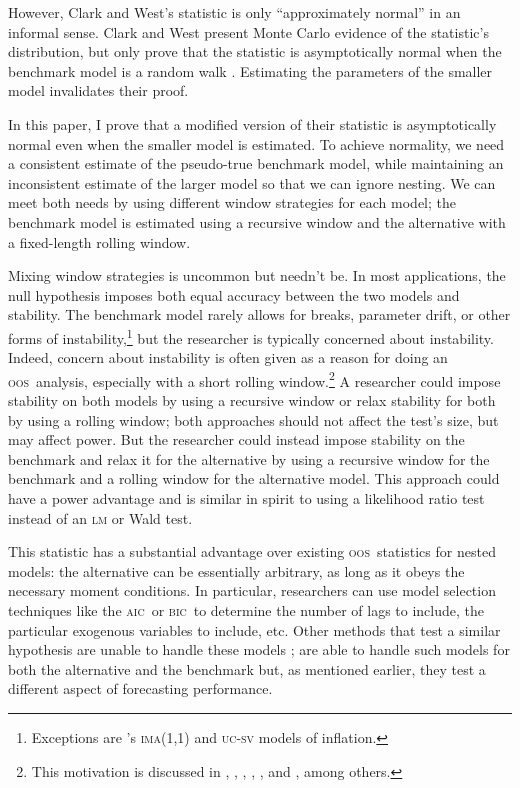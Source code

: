\documentclass[12pt]{article}
\newcommand\citepos[2][]{\citeauthor{#2}'s \citeyearpar[#1]{#2}}
\theoremstyle{definition}
\newcommand{\aic}{\textsc{aic}}
\newcommand{\bic}{\textsc{bic}}
\newcommand{\oos}{\textsc{oos}}
\begin{document}
However, Clark and West's statistic is only ``approximately normal''
in an informal sense.  Clark and West present Monte Carlo evidence of
the statistic's distribution, but only prove that the statistic is
asymptotically normal when the benchmark model is a random walk
\citep{ClW:06}. Estimating the parameters of the smaller model
invalidates their proof.

In this paper, I prove that a modified version of their statistic is
asymptotically normal even when the smaller model is estimated.  To
achieve normality, we need a consistent estimate of the pseudo-true
benchmark model, while maintaining an inconsistent estimate of the
larger model so that we can ignore nesting.  We can meet both needs by
using different window strategies for each model; the benchmark model
is estimated using a recursive window and the alternative with a
fixed-length rolling window.

Mixing window strategies is uncommon but needn't be. In most
applications, the null hypothesis imposes both equal accuracy between
the two models and stability.  The benchmark model rarely allows for
breaks, parameter drift, or other forms of
instability,\footnote{Exceptions are \citepos{StW:07}
  \textsc{ima}(1,1) and \textsc{uc-sv} models of inflation.} but the
researcher is typically concerned about instability.  Indeed, concern
about instability is often given as a reason for doing an \oos\
analysis, especially with a short rolling window.\footnote{This
  motivation is discussed in \citet{StW:03}, \citet{PeT:05,PeT:07},
  \cite{GiW:06}, \citet{GoW:08}, \citet{ClM:09c}, and
  \cite{GiR:09,GiR:10}, among others.} A researcher could impose
stability on both models by using a recursive window or relax
stability for both by using a rolling window; both approaches should
not affect the test's size, but may affect power.  But the researcher
could instead impose stability on the benchmark and relax it for the
alternative by using a recursive window for the benchmark and a
rolling window for the alternative model.  This approach could have a
power advantage and is similar in spirit to using a likelihood ratio
test instead of an \textsc{lm} or Wald test.

This statistic has a substantial advantage over existing \oos\
statistics for nested models: the alternative can be essentially
arbitrary, as long as it obeys the necessary moment conditions.  In
particular, researchers can use model selection techniques like the
\aic\ or \bic\ to determine the number of lags to include, the
particular exogenous variables to include, etc.  Other methods that
test a similar hypothesis are unable to handle these models
\citep[except][which does not allow the benchmark to be
estimated]{ClW:06}; \citet{GiW:06} are able to handle such models for
both the alternative and the benchmark but, as mentioned earlier, they
test a different aspect of forecasting performance.
\end{document}
